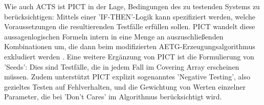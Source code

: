 Wie auch ACTS ist PICT in der Lage, Bedingungen des zu testenden Systems zu berücksichtigen: Mittels einer 'IF-THEN'-Logik kann spezifiziert werden, welche Voraussetzungen die resultierenden Testfälle erfüllen sollen. PICT wandelt diese aussagenlogischen Formeln intern in eine Menge an auszuschließenden Kombinationen um, die dann beim modifizierten AETG-Erzeugungsalgorithmus exkludiert werden \cite{czerwonka2006pairwise}. Eine weitere Ergänzung von PICT ist die Formulierung von 'Seeds': Dies sind Testfälle, die in jedem Fall im Covering Array erscheinen müssen. Zudem unterstützt PICT explizit sogenanntes 'Negative Testing', also gezieltes Testen auf Fehlverhalten, und die Gewichtung von Werten einzelner Parameter, die bei 'Don't Cares' im Algorithmus berücksichtigt wird.

